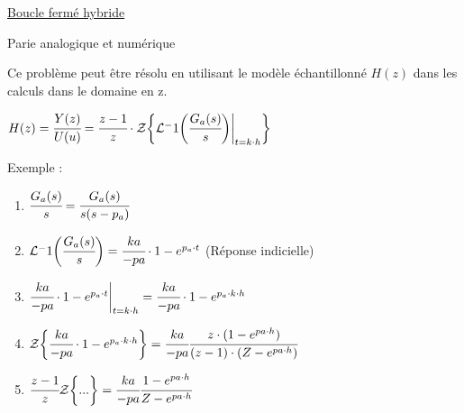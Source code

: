 
\underline{Boucle fermé hybride }

Parie analogique et numérique

\begin{center}
\end{center}

Ce problème peut être résolu en utilisant le modèle échantillonné $H(z)$ dans les calculs dans le domaine en z.

\begin{center}
\end{center}


$H(z) = \cfrac{Y(z)}{U(u)}= \cfrac{z-1}{z} \cdot \mathcal{Z}\biggl\{ \mathcal{L}^-1\biggl( \cfrac{G_a(s)}{s}\biggr)\bigg|_{t = k\cdot h}\biggr\}$

Exemple :

\begin{enumerate}
    \item $\cfrac{G_a(s)}{s} = \cfrac{G_a(s)}{s(s-p_a)}$
    \item $\mathcal{L}^-1\biggl(\cfrac{G_a(s)}{s}\biggr) = \cfrac{ka}{-pa} \cdot 1-e^{p_a \cdot t}$ (Réponse indicielle)
    \item $\cfrac{ka}{-pa} \cdot 1-e^{p_a \cdot t}\bigg|_{t = k\cdot h} = \cfrac{ka}{-pa} \cdot 1-e^{p_a\cdot k\cdot h}$
    \item $\mathcal{Z}\biggl\{ \cfrac{ka}{-pa} \cdot 1-e^{p_a\cdot k\cdot h}  \biggr\} = \cfrac{ka}{-pa} \cfrac{z\cdot(1-e^{pa \cdot h})}{(z-1)\cdot(Z-e^{pa \cdot h})}$
    \item $\cfrac{z-1}{z} \mathcal{Z}\biggl\{...\biggr\} = \cfrac{ka}{-pa} \cfrac{1-e^{pa \cdot h}}{Z-e^{pa \cdot h}}$
\end{enumerate}

